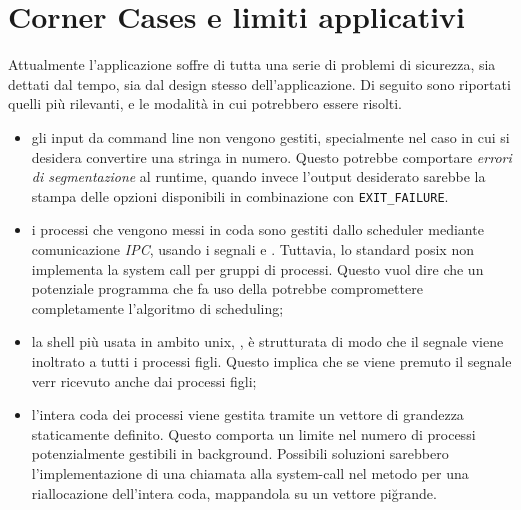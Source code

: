 \documentclass[11pt]{article}
\begin{document}
\\
\\
\\
\\
\\
\\
\\
\\
\\
\\
\\
\\

\section{Corner Cases e limiti applicativi}

Attualmente l'applicazione soffre di tutta una serie di problemi di sicurezza,
sia dettati dal tempo, sia dal design stesso dell'applicazione. Di seguito sono
riportati quelli pi\`u rilevanti, e le modalit\`a in cui potrebbero essere
risolti.

\begin{itemize}
\item gli input da command line non vengono gestiti, specialmente nel caso in cui si desidera convertire una stringa in numero.
      Questo potrebbe comportare \emph{errori di segmentazione} al runtime, quando invece l'output desiderato sarebbe la stampa
      delle opzioni disponibili  in combinazione con \texttt{EXIT\_FAILURE}.

\item i processi che vengono messi in coda sono gestiti dallo scheduler mediante
      comunicazione \emph{IPC}, usando i segnali
       e . Tuttavia, lo standard posix non
      implementa la system call  per gruppi di processi. Questo vuol
      dire che un potenziale programma che fa uso della  potrebbe
      compromettere completamente l'algoritmo di scheduling;

\item la shell pi\`u usata in ambito unix, , \`e strutturata di modo
      che il segnale  viene inoltrato a tutti i processi figli.
      Questo implica che se viene premuto  il segnale verr ricevuto
      anche dai processi figli;

\item l'intera coda dei processi viene gestita tramite un vettore di grandezza 
      staticamente definito. Questo comporta un limite nel numero di processi potenzialmente
      gestibili in background. Possibili soluzioni sarebbero l'implementazione di una chiamata alla
      system-call  nel metodo  per una riallocazione
      dell'intera coda, mappandola su un vettore pi\u grande.
\end{itemize}
\end{document}
